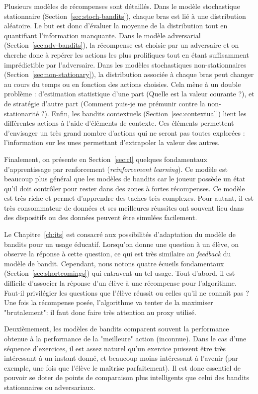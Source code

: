 Plusieurs modèles de récompenses sont détaillés. Dans le modèle stochastique stationnaire (Section~\ref{sec:stoch-bandits}), chaque bras est lié à une distribution aléatoire. Le but est donc d'évaluer la moyenne de la distribution tout en quantifiant l'information manquante. Dans le modèle adversarial (Section~\ref{sec:adv-bandits}), la récompense est choisie par un adversaire et on cherche donc à repérer les actions les plus prolifiques tout en étant suffisamment imprédictible par l'adversaire. Dans les modèles stochastiques non-stationnaires (Section~\ref{sec:non-stationary}), la distribution associée à chaque bras peut changer au cours du temps ou en fonction des actions choisies. Cela mène à un double problème : d'estimation statistique d'une part (Quelle est la valeur courante ?), et de stratégie d'autre part (Comment puis-je me prémunir contre la non-stationarité ?). Enfin, les bandits contextuels (Section~\ref{sec:contextual}) lient les différentes actions à l'aide d'éléments de contexte. Ces éléments permettent d'envisager un très grand nombre d'actions qui ne seront pas toutes explorées : l'information sur les unes permettant d'extrapoler la valeur des autres. 

Finalement, on présente en Section~\ref{sec:rl} quelques fondamentaux d'apprentissage par renforcement (\emph{reinforcement learning}). Ce modèle est beaucoup plus général que les modèles de bandits car le joueur possède un état qu'il doit contrôler pour rester dans des zones à fortes récompenses. Ce modèle est très riche et permet d'apprendre des taches très complexes. Pour autant, il est très consommateur de données et ses meilleures réussites ont souvent lieu dans des dispositifs ou des données peuvent être simulées facilement.

Le Chapitre~\ref{ch:its} est consacré aux possibilités d'adaptation du modèle de bandits pour un usage éducatif. Lorsqu'on donne une question à un élève, on observe la réponse à cette question, ce qui est très similaire au \emph{feedback} du modèle de bandit. Cependant, nous notons quatre écueils fondamentaux (Section~\ref{sec:shortcomings}) qui entravent un tel usage. Tout d'abord, il est difficile d'associer la réponse d'un élève à une récompense pour l'algorithme. Faut-il privilégier les questions que l'élève réussit ou celles qu'il ne connaît pas ? Une fois la récompense posée, l'algorithme va tenter de la maximiser "brutalement": il faut donc faire très attention au proxy utilisé.




Deuxièmement, les modèles de bandits comparent souvent la performance obtenue à la performance de la "meilleure" action (inconnue). Dans le cas d'une séquence d'exercices, il est assez naturel qu'un exercice puissent être très intéressant à un instant donné, et beaucoup moins intéressant à l'avenir (par exemple, une fois que l'élève le maîtrise parfaitement). Il est donc essentiel de pouvoir se doter de points de comparaison plus intelligents que celui des bandits stationnaires ou adversariaux. 

